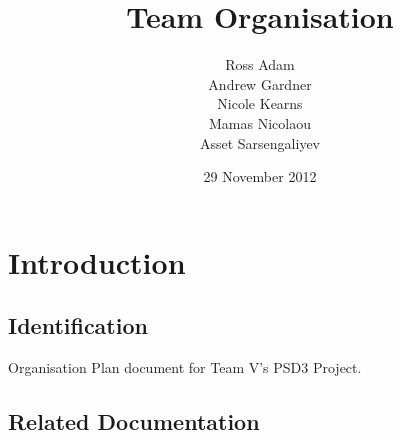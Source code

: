 \documentclass{l3deliverable}
\title{Team Organisation}
\author{Ross Adam\\
     	Andrew Gardner\\
     	Nicole Kearns\\
 	Mamas Nicolaou\\
    	Asset Sarsengaliyev\\
}
\date{29 November 2012}
\begin{document}

\maketitle


\section{Introduction}

\subsection{Identification}

Organisation Plan document for Team V's PSD3 Project.

\subsection{Related Documentation}
\end{document}
